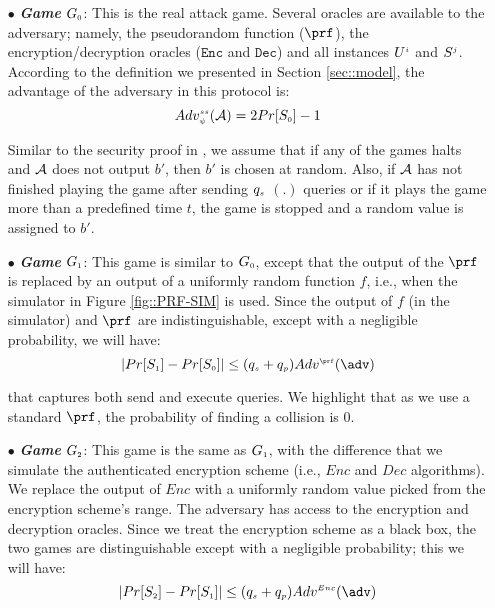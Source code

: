 \begin{itemize}
%
\item[$\bullet$] \textit{\textbf{Game}} $G_{\scriptscriptstyle  0}$: This is the real attack game. Several oracles are  available to the adversary; namely, the pseudorandom function ($\prf$),  the encryption/decryption oracles ($\mathtt{Enc}$ and $\mathtt{Dec}$) and all instances $U^{\scriptscriptstyle  i}$ and $S^{\scriptscriptstyle  j}$.
%
According to the definition we presented in Section \ref{sec::model}, the advantage of the adversary in this protocol is: 
%
\begin{equation}\label{eq::adv-ake-}
Adv_{\scriptscriptstyle  \psi}^{\scriptscriptstyle  ss}(\mathcal{A})=2Pr[S_{\scriptscriptstyle  0}]-1
\end{equation}

Similar to the security proof in \cite{BressonCP03}, we assume that if any of the games halts and $\mathcal{A}$ does not output $b'$, then $b'$  is chosen at random. Also, if $\mathcal{A}$ has not finished playing the game after sending $q_{\scriptscriptstyle  s}$  \send$(.)$ queries or if it plays the game more than a predefined time $t$, the game is stopped and a random value is assigned to $b'$. 
%



\item[$\bullet$] \textit{\textbf{Game}}  $G_{\scriptscriptstyle  1}$: This game is similar to  $G_{\scriptscriptstyle  0}$, except that the output of the $\prf$ is replaced by an output of  a uniformly random function $f$, i.e., when the simulator in Figure \ref{fig::PRF-SIM} is used. Since the output of $f$ (in the simulator) and $\prf$ are indistinguishable, except with a negligible probability, we will have: 
%
\begin{equation}\label{eq::game_1}
|Pr[S_{\sss  1}]-Pr[S_{\sss  0}]|\leq (q_{\sss s}+q_{\sss p})Adv^{\sss\prf}(\adv)
\end{equation}

that captures both send and execute queries. We highlight that as we use a standard $\prf$, the probability of finding a collision is $0$. 



\item[$\bullet$] \textit{\textbf{Game}}  $G_{\scriptscriptstyle  2}$: This game is the same as $G_{\scriptscriptstyle  1}$, with the difference that we simulate the authenticated encryption scheme (i.e., $Enc$ and $Dec$ algorithms). We replace the output of $Enc$ with a uniformly random value picked from the encryption scheme's range. The adversary has access to the encryption and decryption oracles. Since we treat the encryption scheme as a black box, the two games are distinguishable except with a negligible probability; this we will have: 
\begin{equation}\label{eq::game_2}
|Pr[S_{\sss  2}]-Pr[S_{\sss  1}]| \leq (q_{\sss s}+q_{\sss p}) Adv^{\sss Enc}(\adv)
\end{equation}


\end{itemize}
